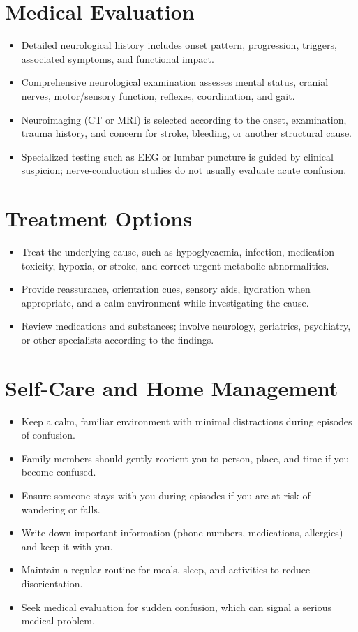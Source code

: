 \section*{Medical Evaluation}
\begin{itemize}
  \item Detailed neurological history includes onset pattern, progression, triggers, associated symptoms, and functional impact.
  \item Comprehensive neurological examination assesses mental status, cranial nerves, motor/sensory function, reflexes, coordination, and gait.
  \item Neuroimaging (CT or MRI) is selected according to the onset, examination, trauma history, and concern for stroke, bleeding, or another structural cause.
  \item Specialized testing such as EEG or lumbar puncture is guided by clinical suspicion; nerve-conduction studies do not usually evaluate acute confusion.
\end{itemize}

\section*{Treatment Options}
\begin{itemize}
  \item Treat the underlying cause, such as hypoglycaemia, infection, medication toxicity, hypoxia, or stroke, and correct urgent metabolic abnormalities.
  \item Provide reassurance, orientation cues, sensory aids, hydration when appropriate, and a calm environment while investigating the cause.
  \item Review medications and substances; involve neurology, geriatrics, psychiatry, or other specialists according to the findings.
\end{itemize}

\section*{Self-Care and Home Management}
\begin{itemize}
  \item Keep a calm, familiar environment with minimal distractions during episodes of confusion.
  \item Family members should gently reorient you to person, place, and time if you become confused.
  \item Ensure someone stays with you during episodes if you are at risk of wandering or falls.
  \item Write down important information (phone numbers, medications, allergies) and keep it with you.
  \item Maintain a regular routine for meals, sleep, and activities to reduce disorientation.
  \item Seek medical evaluation for sudden confusion, which can signal a serious medical problem.
\end{itemize}

